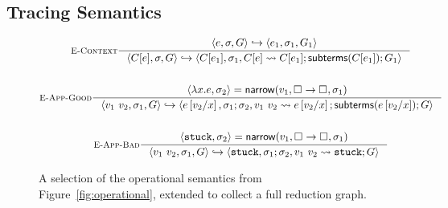 \subsection{Tracing Semantics}
\label{sec:inter-semant}
%
\begin{figure}[t]
\begin{gather*}
\inference[\recontext]
  {\stepg{e}{\su}{\tr}{e_1}{\su_1}{\tr_1}}
  {\stepg{C[e]}{\su}{\tr}{C[e_1]}{\su_1}{\singlestep{C[e]}{C[e_1]}; \subterms{C[e_1]}; \tr_1}}
\\ \\
\inference[\reappgood]
  {\pair{\efun{x}{e}}{\su_2} = \force{v_1}{\tfun{\thole{}}{\thole{}}}{\su_1}}
  {\stepg{\eapp{v_1}{v_2}}{\su_1}{\tr}
         {e\sub{x}{v_2}}{\su_1;\su_2}{\singlestep{\eapp{v_1}{v_2}}{e\sub{x}{v_2}}; \subterms{e\sub{x}{v_2}}; \tr}}
\\ \\
\inference[\reappbad]
  {\pair{\stuck}{\su_2} = \force{v_1}{\tfun{\thole{}}{\thole{}}}{\su_1}}
  {\stepg{\eapp{v_1}{v_2}}{\su_1}{\tr}{\stuck}{\su_1;\su_2}{\singlestep{\eapp{v_1}{v_2}}{\stuck}; \tr}}
\end{gather*}
\caption{A selection of the operational semantics from
  Figure~\ref{fig:operational}, extended to collect a full reduction
  graph.}
\label{fig:interactive}
\end{figure}

